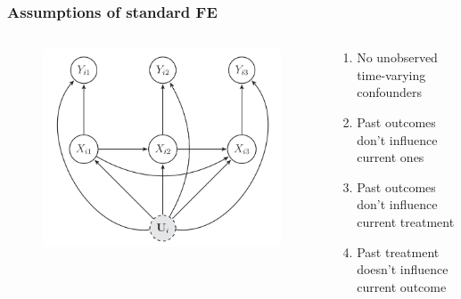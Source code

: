 \documentclass[11pt,english,dvipsnames,aspectratio=169,handout]{beamer}\usepackage[]{graphicx}\usepackage[]{xcolor}
\begin{document}
\begin{frame}
  \frametitle{Assumptions of standard FE}
  
  \begin{columns}
  	\begin{column}{0.65\textwidth}
		\begin{figure}
		\centering
		\includegraphics[scale=0.3]{../04-figures/09/01.PNG}
		\end{figure}
	  \end{column}
	\pause
	\begin{column}{0.35\textwidth}
	\footnotesize
	\begin{enumerate}
		\item No unobserved time-varying confounders\pause
		\item Past outcomes don't influence current ones\pause
		\item Past outcomes don't influence current treatment\pause
		\item Past treatment doesn't influence current outcome
	\end{enumerate}
	\end{column}
\end{columns}
  
\end{frame}
\end{document}
